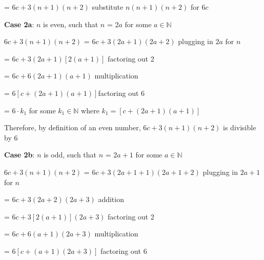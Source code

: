 \documentclass{article} %
\begin{document}
    \tabto*{3.51cm} = $6c + 3(n+1)(n+2)$ \tabto*{9.6cm}substitute $n(n+1)(n+2)$ for $6c$
    \vspace*{0.08cm}

    \tabto*{2cm} \textbf{Case 2a}: $n$ is even, such that $n$ = $2a$ for some $a \in \mathbb{N}$
    \vspace*{0.08cm}

    \tabto*{2cm} $6c + 3(n+1)(n+2)$ = $6c + 3(2a + 1)(2a + 2)$ \tabto*{9.5cm}plugging in $2a$ for $n$
    \vspace*{0.08cm}

    \tabto*{5.24cm} = $6c + 3(2a + 1)[2(a + 1)]$ \tabto*{9.5cm}factoring out 2
    \vspace*{0.08cm}

    \tabto*{5.24cm} = $6c + 6(2a + 1)(a + 1)$ \tabto*{9.5cm}multiplication
    \vspace*{0.08cm}
    
    \tabto*{5.24cm} = $6[c + (2a + 1)(a + 1)]$\tabto*{9.5cm}factoring out 6
    \vspace*{0.08cm}

    \tabto*{5.24cm} = $6 \cdot k_{1}$ for some $k_{1} \in \mathbb{N}$ where $k_{1} = [c + (2a + 1)(a + 1)]$


    \tabto*{2cm} Therefore, by definition of an even number, $6c + 3(n+1)(n+2)$ is divisible by 6
    \vspace*{0.3cm}

    \tabto*{2cm} \textbf{Case 2b}: $n$ is odd, such that $n$ = $2a + 1$ for some $a \in \mathbb{N}$
    \vspace*{0.08cm}

    \tabto*{2cm} $6c + 3(n+1)(n+2)$ = $6c + 3(2a+1 + 1)(2a+1 + 2)$ \tabto*{10.4cm}plugging in $2a+1$ for $n$
    \vspace*{0.08cm}

    \tabto*{5.24cm} = $6c + 3(2a+2)(2a+3)$ \tabto*{10.4cm}addition
    \vspace*{0.08cm}

    \tabto*{5.24cm} = $6c + 3[2(a+1)](2a+3)$ \tabto*{10.4cm}factoring out 2
    \vspace*{0.08cm}

    \tabto*{5.24cm} = $6c + 6(a+1)(2a+3)$ \tabto*{10.4cm}multiplication
    \vspace*{0.08cm}

    \tabto*{5.24cm} = $6[c + (a+1)(2a+3)]$ \tabto*{10.4cm}factoring out 6
    \vspace*{0.08cm}
    
\end{document}
